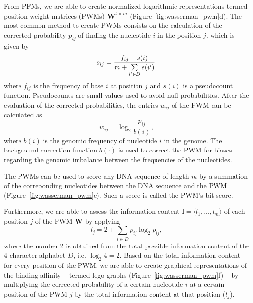 From PFMs, we are able to create normalized logarithmic representations termed position weight matrices (PWMs) $\mathbf{W}^{4 \times m}$ (Figure~\ref{fig:wasserman_pwm}d). The most common method to create PWMs consists on the calculation of the corrected probability $ p_{ij} $ of finding the nucleotide $ i $ in the position $ j $, which is given by
\begin{equation}
  \label{eq:pwm1}
  p_{ij} = \frac{ f_{ij} + s(i) }{ m + {\sum\limits _{i^\prime \in D}{ \hspace{-0.0cm} s(i^\prime)}} }, 
\end{equation}
where $ f_{ij} $ is the frequency of base $ i $ at position $ j $ and $ s(i) $ is a pseudocount function. Pseudocounts are small values used to avoid null probabilities. After the evaluation of the corrected probabilities, the entries $ w_{ij} $ of the PWM can be calculated as
\begin{equation}
  \label{eq:pwm2}
  w_{ij} = \log_2 \frac{ p_{ij} }{ b(i) }, 
\end{equation}
where $ b(i) $ is the genomic frequency of nucleotide $ i $ in the genome. The background correction function $b(\cdot)$ is used to correct the PWM for biases regarding the genomic imbalance between the frequencies of the nucleotides.

The PWMs can be used to score any DNA sequence of length $m$ by a summation of the correponding nucleotides between the DNA sequence and the PWM (Figure~\ref{fig:wasserman_pwm}e). Such a score is called the PWM's bit-score.

Furthermore, we are able to assess the information content $ \mathbf{l} = \langle{l}_{1}, ..., {l}_{m}\rangle $ of each position $ j $ of the PWM $ \mathbf{W} $ by applying
\begin{equation}
  \label{eq:pwm.ic}
  {l}_{j} = 2 + \sum\limits _{i \in D} p_{ij} \log_{2} p_{ij},
\end{equation}
where the number $2$ is obtained from the total possible information content of the $4$-character alphabet $D$, i.e. $\log_{2}4 = 2$. Based on the total information content for every position of the PWM, we are able to create graphical representations of the binding affinity -- termed logo graphs (Figure~\ref{fig:wasserman_pwm}f) -- by multiplying the corrected probability of a certain nucleotide $i$ at a certain position of the PWM $j$ by the total information content at that position (${l}_{j}$).

